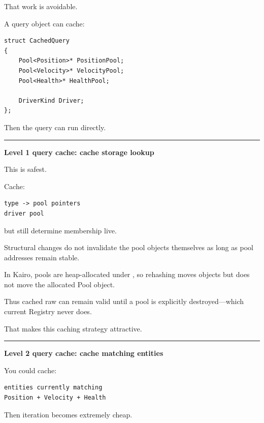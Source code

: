 That work is avoidable.

A query object can cache:

\begin{verbatim}
struct CachedQuery
{
    Pool<Position>* PositionPool;
    Pool<Velocity>* VelocityPool;
    Pool<Health>* HealthPool;

    DriverKind Driver;
};
\end{verbatim}

Then the query can run directly.

\begin{center}\rule{0.5\linewidth}{0.5pt}\end{center}

\textbf{Level 1 query cache: cache storage lookup}

This is safest.

Cache:

\begin{verbatim}
type -> pool pointers
driver pool
\end{verbatim}

but still determine membership live.

Structural changes do not invalidate the pool objects themselves as long as pool addresses remain stable.

In Kairo, pools are heap-allocated under , so  rehashing moves  objects but does not move the allocated Pool object.

Thus cached raw  can remain valid until a pool is explicitly destroyed---which current Registry never does.

That makes this caching strategy attractive.

\begin{center}\rule{0.5\linewidth}{0.5pt}\end{center}

\textbf{Level 2 query cache: cache matching entities}

You could cache:

\begin{verbatim}
entities currently matching
Position + Velocity + Health
\end{verbatim}

Then iteration becomes extremely cheap.

